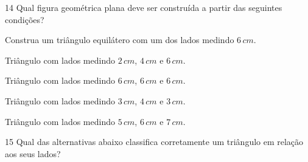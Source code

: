 

\num{14} Qual figura geométrica plana deve ser construída a partir das
seguintes condições?

Construa um triângulo equilátero com um dos lados medindo $6\,cm$.

\begin{escolha}
\item Triângulo com lados medindo $2\,cm$, $4\,cm$ e $6\,cm$. 
\item Triângulo com lados
medindo $6\,cm$, $6\,cm$ e $6\,cm$. 
\item Triângulo com lados medindo $3\,cm$, $4\,cm$ e $3\,cm$.
\item Triângulo com lados medindo $5\,cm$, $6\,cm$ e $7\,cm$.
\end{escolha}



\num{15} Qual das alternativas abaixo classifica corretamente um triângulo em
relação aos seus lados?


